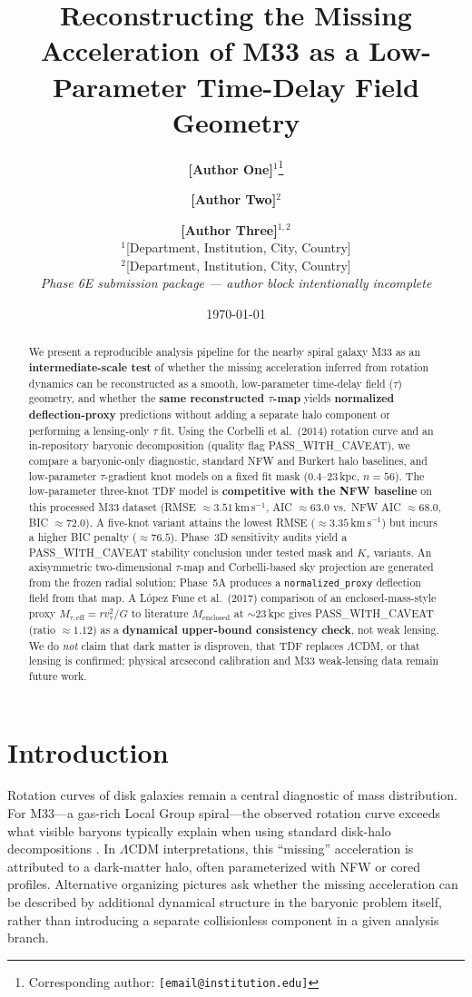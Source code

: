 \documentclass[11pt,a4paper]{article}
\title{Reconstructing the Missing Acceleration of M33 as a Low-Parameter Time-Delay Field Geometry}
\author{%
  \textbf{[Author One]}$^{1}$\thanks{Corresponding author: \texttt{[email@institution.edu]}} \and
  \textbf{[Author Two]}$^{2}$ \and
  \textbf{[Author Three]}$^{1,2}$\\[0.5em]
  {\small
  $^{1}$[Department, Institution, City, Country]\\
  $^{2}$[Department, Institution, City, Country]\\
  \textit{Phase 6E submission package --- author block intentionally incomplete}
  }%
}
\date{\today}
\begin{document}
\maketitle

\begin{abstract}
We present a reproducible analysis pipeline for the nearby spiral galaxy M33 as an \textbf{intermediate-scale test} of whether the missing acceleration inferred from rotation dynamics can be reconstructed as a smooth, low-parameter time-delay field ($\tau$) geometry, and whether the \textbf{same reconstructed $\tau$-map} yields \textbf{normalized deflection-proxy} predictions without adding a separate halo component or performing a lensing-only $\tau$ fit.
Using the Corbelli et al.\ (2014) rotation curve and an in-repository baryonic decomposition (quality flag PASS\_WITH\_CAVEAT), we compare a baryonic-only diagnostic, standard NFW and Burkert halo baselines, and low-parameter $\tau$-gradient knot models on a fixed fit mask ($0.4$--$23$\,kpc, $n{=}56$).
The low-parameter three-knot TDF model is \textbf{competitive with the NFW baseline} on this processed M33 dataset (RMSE $\approx 3.51$\,km\,s$^{-1}$, AIC $\approx 63.0$ vs.\ NFW AIC $\approx 68.0$, BIC $\approx 72.0$).
A five-knot variant attains the lowest RMSE ($\approx 3.35$\,km\,s$^{-1}$) but incurs a higher BIC penalty ($\approx 76.5$).
Phase~3D sensitivity audits yield a PASS\_WITH\_CAVEAT stability conclusion under tested mask and $K_\tau$ variants.
An axisymmetric two-dimensional $\tau$-map and Corbelli-based sky projection are generated from the frozen radial solution; Phase~5A produces a \texttt{normalized\_proxy} deflection field from that map.
A L\'opez Fune et al.\ (2017) comparison of an enclosed-mass-style proxy $M_{\tau,\mathrm{eff}}=r v_\tau^2/G$ to literature $M_{\mathrm{enclosed}}$ at $\sim 23$\,kpc gives PASS\_WITH\_CAVEAT (ratio $\approx 1.12$) as a \textbf{dynamical upper-bound consistency check}, not weak lensing.
We do \emph{not} claim that dark matter is disproven, that TDF replaces $\Lambda$CDM, or that lensing is confirmed; physical arcsecond calibration and M33 weak-lensing data remain future work.
\end{abstract}

\section{Introduction}
\label{sec:intro}

Rotation curves of disk galaxies remain a central diagnostic of mass distribution.
For M33---a gas-rich Local Group spiral---the observed rotation curve exceeds what visible baryons typically explain when using standard disk-halo decompositions \citep{Corbelli2014}.
In $\Lambda$CDM interpretations, this ``missing'' acceleration is attributed to a dark-matter halo, often parameterized with NFW or cored profiles.
Alternative organizing pictures ask whether the missing acceleration can be described by additional dynamical structure in the baryonic problem itself, rather than introducing a separate collisionless component in a given analysis branch.
\end{document}
